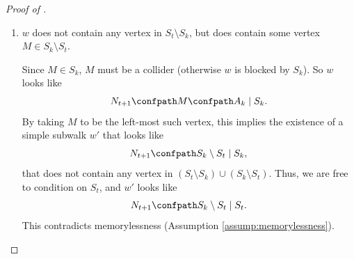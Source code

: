 \documentclass[12pt,a4paper]{article}
\theoremstyle{definition}
\newcommand{\R}[0]{\mathbb{R}}
\begin{document}
\begin{proof}[Proof of ]
\begin{enumerate}
    \item $w$ does not contain any vertex in $S_t \setminus S_k$, but
      does contain some vertex $M \in S_k \setminus S_t$.

    Since $M \in S_k$, $M$ must be a collider (otherwise $w$ is
    blocked by $S_k$). So $w$ looks like
    \[
        N_{t+1} \confpath M \confpath A_k \mid S_k.
    \]
    By taking $M$ to be the left-most such vertex, this implies the
    existence of a simple subwalk $w'$ that looks like
    \[
        N_{t+1} \confpath S_k \setminus S_t \mid S_{k},
    \]
    that does not contain any vertex in $(S_t \setminus S_k) \cup (S_k
    \setminus S_t)$. Thus, we are free to condition on $S_t$, and $w'$
    looks like
    \[
      N_{t+1} \confpath S_k \setminus S_t \mid S_{t}.
    \]
    This contradicts memorylessness (Assumption \ref{assump:memorylessness}).
  \end{enumerate}
\end{proof}



\end{document}
